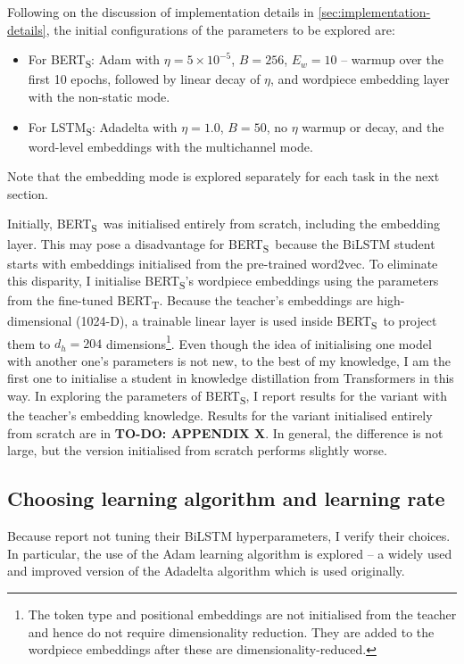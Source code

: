 \documentclass[bsc,frontabs,singlespacing,parskip,deptreport]{infthesis}
\def\BERTT{BERT\textsubscript{T}}
\def\BERTS{BERT\textsubscript{S}}
\def\LSTMS{LSTM\textsubscript{S}}
\begin{document}
{{      %
    Following on the discussion of implementation details in \autoref{sec:implementation-details}, the initial configurations of the parameters to be explored are:
    \begin{itemize}
      \item For \BERTS: Adam with $\eta=5\times10^{-5}$, $B=256$, $E_{w}=10$ -- warmup over the first 10 epochs, followed by linear decay of $\eta$, and wordpiece embedding layer with the non-static mode.
      \item For \LSTMS: Adadelta with $\eta=1.0$, $B=50$, no $\eta$ warmup or decay, and the word-level embeddings with the multichannel mode.
    \end{itemize}
    Note that the embedding mode is explored separately for each task in the next section.

    Initially, \BERTS~was initialised entirely from scratch, including the embedding layer. 
    This may pose a disadvantage for \BERTS~because the BiLSTM student starts with embeddings initialised from the pre-trained word2vec. To eliminate this disparity, I initialise \BERTS's wordpiece embeddings using the parameters from the fine-tuned \BERTT. 
    Because the teacher's embeddings are high-dimensional (1024-D), a trainable linear layer is used inside \BERTS~to project them to $d_h=204$ dimensions\footnote{The token type and positional embeddings are not initialised from the teacher and hence do not require dimensionality reduction. They are added to the wordpiece embeddings after these are dimensionality-reduced.}.
    Even though the idea of initialising one model with another one's parameters is not new, to the best of my knowledge, I am the first one to initialise a student in knowledge distillation from Transformers in this way.
    In exploring the parameters of \BERTS, I report results for the variant with the teacher's embedding knowledge. Results for the variant initialised entirely from scratch are in \textbf{TO-DO: APPENDIX X}.
    In general, the difference is not large, but the version initialised from scratch performs slightly worse.
    
    \subsection{Choosing learning algorithm and learning rate}{
      Because \citet{Tang_2019b} report not tuning their BiLSTM hyperparameters, I verify their choices.
      In particular, the use of the Adam learning algorithm is explored -- a widely used and improved version of the Adadelta algorithm which is used originally.

}}}
\end{document}
